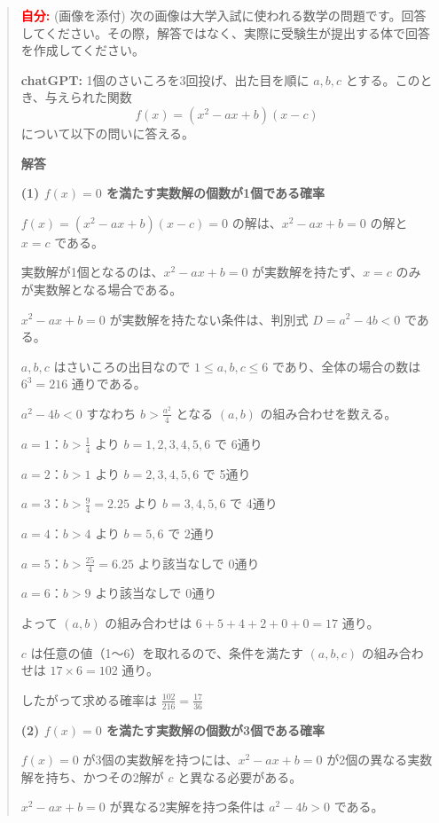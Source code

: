 \documentclass[a4j,uplatex]{jsarticle}
\newcommand{\speakerA}[1]{\textbf{\textcolor{red}{#1}}}
\newcommand{\speakerB}[1]{\textbf{\textcolor{green!60!black}{#1}}}
\newenvironment{dialogue}
{%
    \begin{quote}
        \setlength{\parskip}{0.5em}
        \setlength{\parindent}{0em}
        }
        {%
    \end{quote}
}
\newcommand{\sayA}[2]{\speakerA{#1:} #2\par}
\newcommand{\sayB}[2]{\speakerB{#1:} #2\par}
\theoremstyle{definition}
\begin{document}
\begin{dialogue}
    \sayA{自分}{(画像を添付) 次の画像は大学入試に使われる数学の問題です。回答してください。その際，解答ではなく、実際に受験生が提出する体で回答を作成してください。}
    \sayB{chatGPT}{1個のさいころを3回投げ、出た目を順に $a,b,c$ とする。このとき、与えられた関数
        $$f(x) = (x^2 - ax + b)(x - c)$$
        について以下の問いに答える。

        \textbf{解答}

        \textbf{(1) $f(x) = 0$ を満たす実数解の個数が1個である確率}

        $f(x) = (x^2 - ax + b)(x - c) = 0$ の解は、$x^2 - ax + b = 0$ の解と $x = c$ である。

        実数解が1個となるのは、$x^2 - ax + b = 0$ が実数解を持たず、$x = c$ のみが実数解となる場合である。

        $x^2 - ax + b = 0$ が実数解を持たない条件は、判別式 $D = a^2 - 4b < 0$ である。

        $a, b, c$ はさいころの出目なので $1 \leq a, b, c \leq 6$ であり、全体の場合の数は $6^3 = 216$ 通りである。

        $a^2 - 4b < 0$ すなわち $b > \frac{a^2}{4}$ となる $(a, b)$ の組み合わせを数える。

        $a = 1$：$b > \frac{1}{4}$ より $b = 1, 2, 3, 4, 5, 6$ で 6通り

        $a = 2$：$b > 1$ より $b = 2, 3, 4, 5, 6$ で 5通り

        $a = 3$：$b > \frac{9}{4} = 2.25$ より $b = 3, 4, 5, 6$ で 4通り

        $a = 4$：$b > 4$ より $b = 5, 6$ で 2通り

        $a = 5$：$b > \frac{25}{4} = 6.25$ より該当なしで 0通り

        $a = 6$：$b > 9$ より該当なしで 0通り

        よって $(a, b)$ の組み合わせは $6 + 5 + 4 + 2 + 0 + 0 = 17$ 通り。

        $c$ は任意の値（1〜6）を取れるので、条件を満たす $(a, b, c)$ の組み合わせは $17 \times 6 = 102$ 通り。

        したがって求める確率は $\frac{102}{216} = \frac{17}{36}$

        \textbf{(2) $f(x) = 0$ を満たす実数解の個数が3個である確率}

        $f(x) = 0$ が3個の実数解を持つには、$x^2 - ax + b = 0$ が2個の異なる実数解を持ち、かつその2解が $c$ と異なる必要がある。

        $x^2 - ax + b = 0$ が異なる2実解を持つ条件は $a^2 - 4b > 0$ である。

}
\end{dialogue}
\end{document}

